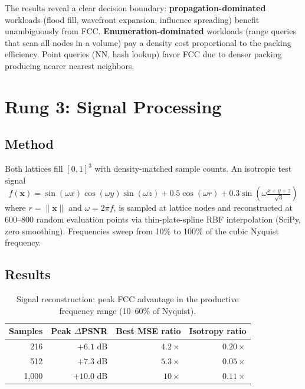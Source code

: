 \documentclass[11pt]{article}
\begin{document}
The results reveal a clear decision boundary:
\textbf{propagation-dominated} workloads (flood fill, wavefront
expansion, influence spreading) benefit unambiguously from FCC.
\textbf{Enumeration-dominated} workloads (range queries that scan
all nodes in a volume) pay a density cost proportional to the
packing efficiency. Point queries (NN, hash lookup) favor FCC
due to denser packing producing nearer nearest neighbors.

\section{Rung 3: Signal Processing}
\label{sec:signal}

\subsection{Method}

Both lattices fill $[0,1]^3$ with density-matched sample counts.
An isotropic test signal
\begin{equation}
  f(\mathbf{x}) = \sin(\omega x)\cos(\omega y)\sin(\omega z)
    + 0.5\cos(\omega r) + 0.3\sin\!\left(\omega\tfrac{x+y+z}{\sqrt{3}}\right)
\end{equation}
where $r = \|\mathbf{x}\|$ and $\omega = 2\pi f$, is sampled at
lattice nodes and reconstructed at 600--800 random evaluation points
via thin-plate-spline RBF interpolation (SciPy, zero smoothing).
Frequencies sweep from 10\% to 100\% of the cubic Nyquist frequency.

\subsection{Results}

\begin{table}[H]
\centering
\caption{Signal reconstruction: peak FCC advantage in the
productive frequency range (10--60\% of Nyquist).}
\label{tab:signal}
\begin{tabular}{rrrr}
\toprule
Samples & Peak $\Delta$PSNR & Best MSE ratio & Isotropy ratio \\
\midrule
216   & $+6.1$ dB  & $4.2\times$ & $0.20\times$ \\
512   & $+7.3$ dB  & $5.3\times$ & $0.05\times$ \\
1{,}000 & $+10.0$ dB & $10\times$  & $0.11\times$ \\
\bottomrule
\end{tabular}
\end{table}
\end{document}
